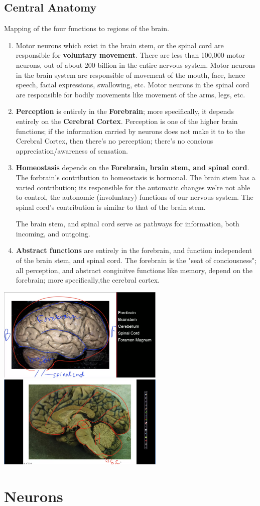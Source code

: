 \documentclass[12pt, a4paper]{article}
\begin{document}
\subsection{Central Anatomy}
Mapping of the four functions to regions of the brain.
\begin{enumerate}
    \item Motor neurons which exist in the brain stem, or the spinal cord are responsible
    for \textbf{voluntary movement}. There are less than 100,000 motor neurons, out of about 200 billion
    in the entire nervous system. Motor neurons in the brain system are responsible of movement of the mouth, face,
    hence speech, facial expressions, swallowing, etc.
    Motor neurons in the spinal cord are responsible for bodily movements like movement of the arms,
    legs, etc.
    \item \textbf{Perception} is entirely in the \textbf{Forebrain}; more specifically,  it depends entirely on the \textbf{Cerebral Cortex}.
    Perception is one of the higher brain functions; if the information carried by neurons does not 
    make it to to the Cerebral Cortex, then there's no perception; there's no concious appreciation/awareness
    of sensation.
    \item \textbf{Homeostasis} depends on the \textbf{Forebrain, brain stem, and spinal cord}.
    The forbrain's contribution to homeostasis is hormonal. The brain stem has a varied contribution; its responsible for
    the automatic changes we're not able to control, the autonomic (involuntary) functions of our nervous system. The spinal cord's
    contribution is similar to that of the brain stem.
    
    The brain stem, and spinal cord serve as pathways for information, both incoming, and outgoing. 

    \item \textbf{Abstract functions} are entirely in the forebrain, and function independent of the brain stem, and spinal cord.
    The forebrain is the "seat of conciousness"; all perception, and abstract conginitve functions like memory, depend on the forebrain;
    more specifically,the cerebral cortex.
\end{enumerate}

{
    \centering
    \includegraphics[width=8cm]{BrainImg_FromSide_SidesAnnotated.png}
    \includegraphics[width=8cm]{BrainImg_CutFromSide_MidHindBrainStem.png}

}
\newpage

\section{Neurons}
\end{document}
